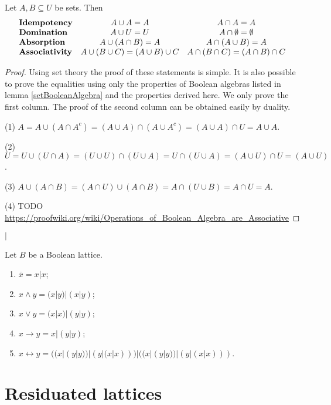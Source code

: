 \begin{corollary} \label{BooleanConsequences}
Let $A,B\subseteq U$ be sets. Then
\[ \begin{array}{l c c}
\text{\textbf{Idempotency}} & A\cup A = A & A\cap A = A \\
\text{\textbf{Domination}} & A\cup U = U & A\cap \emptyset = \emptyset \\
\text{\textbf{Absorption}} & A\cup(A\cap B) = A & A\cap(A\cup B) = A \\
\text{\textbf{Associativity}} & A\cup(B\cup C) = (A\cup B)\cup C & A\cap(B\cap C) = (A\cap B)\cap C
\end{array} \]
\end{corollary}
\begin{proof}
Using set theory the proof of these statements is simple. It is also possible to prove the equalities using only the properties of Boolean algebras listed in lemma \ref{setBooleanAlgebra} and the properties derived here. We only prove the first column. The proof of the second column can be obtained easily by duality.

(1) $A = A\cup(A\cap A^c) = (A\cup A)\cap (A\cup A^c) = (A\cup A)\cap U = A\cup A$.

(2) $U = U\cup (U\cap A) = (U\cup U)\cap (U\cup A) = U\cap (U\cup A) = (A\cup U)\cap U = (A\cup U)$.

(3) $A\cup(A\cap B) = (A\cap U)\cup(A\cap B) = A\cap(U\cup B) = A\cap U = A$.

(4) TODO \url{https://proofwiki.org/wiki/Operations_of_Boolean_Algebra_are_Associative}
\end{proof}

\begin{definition}
 $|$
\end{definition}

\begin{proposition}
Let $B$ be a Boolean lattice.
\begin{enumerate}
\item $\overline{x} = x|x$;
\item $x\wedge y = (x|y)|(x|y)$;
\item $x\vee y = (x|x)|(y|y)$;
\item $x\to y = x|(y|y)$;
\item $x\leftrightarrow y = ((x|(y|y))|(y|(x|x)))|((x|(y|y))|(y|(x|x)))$.
\end{enumerate}
\end{proposition}

\section{Residuated lattices}


